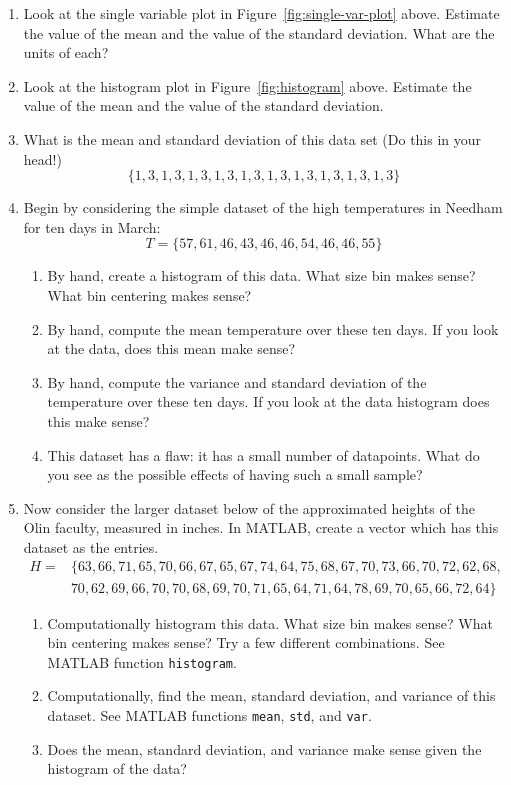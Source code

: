 \begin{prob}
\begin{enumerate}
\item Look at the single variable plot in Figure~\ref{fig:single-var-plot} above.  Estimate the value of the mean and the value of the standard deviation.  What are the units of each?
\item Look at the histogram plot in Figure~\ref{fig:histogram} above.  Estimate the value of the mean and the value of the standard deviation.
\item What is the mean and standard deviation of this data set (Do this in your head!)
$$\{1,3,1,3,1,3,1,3,1,3,1,3,1,3,1,3,1,3,1,3\}$$
\item  Begin by considering the simple dataset of the high temperatures in Needham for ten days in March:
\begin{equation}
T = \{57,61,46,43,46,46,54,46,46,55\}
\end{equation}
\begin{enumerate}
\item  By hand, create a histogram of this data.  What size bin makes sense? What bin centering makes sense?
\item  By hand, compute the mean temperature over these ten days.  If you look at the data, does this mean make sense?
\item  By hand, compute the variance and standard deviation of the temperature over these ten days.  If you look at the data histogram does this make sense?
\item  This dataset has a flaw: it has a small number of datapoints.  What do you see as the possible effects of having such a small sample?
\end{enumerate}
\item  Now consider the larger dataset below of the approximated heights of the Olin faculty, measured in inches.  In MATLAB, create a vector which has this dataset as the entries.
\begin{align*}
H = &\{63,66,71,65,70,66,67,65,67,74,64,75,68,67,70,73,66,70,72,62,68,\\
&70,62,69,66,70,70,68,69,70,71,65,64,71,64,78,69,70,65,66,72,64\}
\end{align*}
\begin{enumerate}
\item  Computationally histogram this data.  What size bin makes sense?  What bin centering makes sense? Try a few different combinations. See MATLAB function \texttt{histogram}.
\item  Computationally, find the mean, standard deviation, and variance of this dataset. See MATLAB functions \texttt{mean}, \texttt{std}, and \texttt{var}.
\item  Does the mean, standard deviation, and variance make sense given the histogram of the data?
\end{enumerate}
\end{enumerate}
\end{prob}
